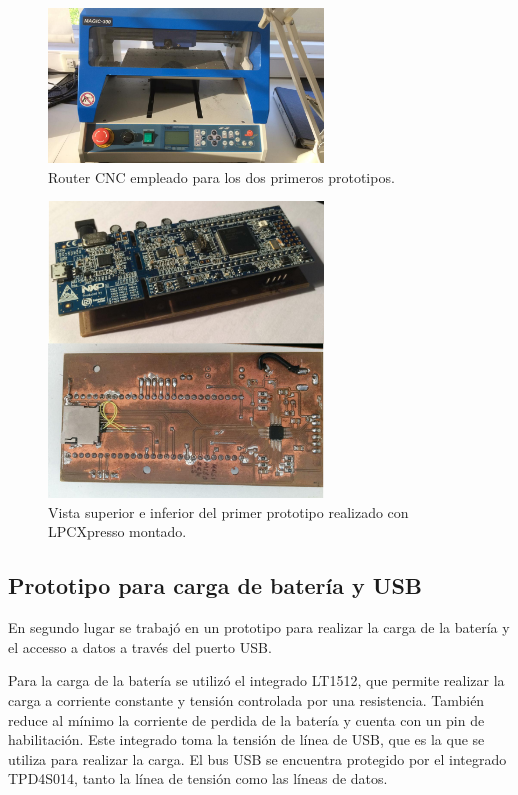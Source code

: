\begin{figure}[!htbp]
	\centering
	
	\includegraphics[width=0.65\textwidth]{./Figures/magic300.jpeg}		
	
	\caption{Router CNC empleado para los dos primeros prototipos.}
	\label{fig:magic300}
\end{figure}

\begin{figure}[!htbp]
	\centering
	\includegraphics[width=0.65\textwidth]{./Figures/prototipo1conLPCXpresso.jpeg}		
	\caption{Vista superior e inferior del primer prototipo realizado con LPCXpresso montado.}
	\label{fig:prototipo1sup}
\end{figure}


\subsection{Prototipo para carga de batería y USB}

En segundo lugar se trabajó en un prototipo para realizar la carga de la batería y el accesso a datos a través del puerto USB. 

Para la carga de la batería se utilizó el integrado LT1512, que permite realizar la carga a corriente constante y tensión controlada por una resistencia. También reduce al mínimo la corriente de perdida de la batería y cuenta con un pin de habilitación. Este integrado toma la tensión de línea de USB, que es la que se utiliza para realizar la carga. El bus USB se encuentra protegido por el integrado TPD4S014, tanto la línea de tensión como las líneas de datos.


